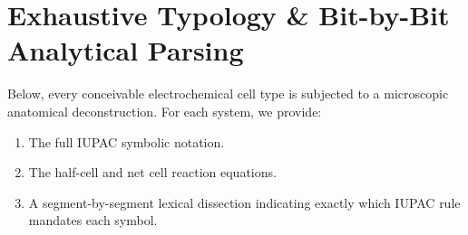 \documentclass[10pt,a4paper]{article}
\begin{document}
\newpage
\section{Exhaustive Typology \& Bit-by-Bit Analytical Parsing}

Below, every conceivable electrochemical cell type is subjected to a microscopic anatomical deconstruction. For each system, we provide:
\begin{enumerate}[label=(\alph*)]
    \item The full IUPAC symbolic notation.
    \item The half-cell and net cell reaction equations.
    \item A segment-by-segment lexical dissection indicating exactly which IUPAC rule mandates each symbol.
\end{enumerate}

\end{document}

